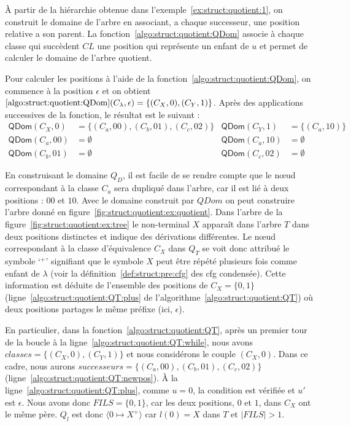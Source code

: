 \begin{example}%
    \label{ex:struct:quotient:2}
    À partir de la hiérarchie obtenue dans l'exemple~\ref{ex:struct:quotient:1}, on construit le domaine de l'arbre en associant, a chaque successeur, une position relative a son parent.
    La fonction~\ref{algo:struct:quotient:QDom} associe à chaque classe qui succèdent $CL$ une position qui représente un enfant de $u$ et permet de calculer le domaine de l'arbre quotient.

    Pour calculer les positions à l'aide de la fonction~\ref{algo:struct:quotient:QDom}, on commence à la position $\epsilon$ et on obtient $\ref{algo:struct:quotient:QDom}(C_\lambda, \epsilon) = \{(C_X, 0), (C_Y, 1)\}$.
    Après des applications successives de la fonction, le résultat est le suivant :
    \begin{align*}
        \textsf{QDom}(C_X, 0)  & = \{(C_a, 00), (C_b, 01), (C_c, 02)\} & \textsf{QDom}(C_Y, 1)  & = \{(C_a, 10)\} \\
        \textsf{QDom}(C_a, 00) & = \emptyset                           & \textsf{QDom}(C_a, 10) & = \emptyset     \\
        \textsf{QDom}(C_b, 01) & = \emptyset                           & \textsf{QDom}(C_c, 02) & = \emptyset
    \end{align*}

    En construisant le domaine $Q_D$, il est facile de se rendre compte que le nœud correspondant à la classe $C_a$ sera dupliqué dans l'arbre, car il est lié à deux positions : $00$ et $10$.
    Avec le domaine construit par $QDom$ on peut construire l'arbre donné en figure~\ref{fig:struct:quotient:ex:quotient}.
    Dans l'arbre de la figure~\ref{fig:struct:quotient:ex:tree} le non-terminal $X$ apparaît dans l'arbre $T$ dans deux positions distinctes et indique des dérivations différentes.
    Le nœud correspondant à la classe d'équivalence $C_X$ dans $Q_T$ se voit donc attribué le symbole `${}^+$' signifiant que le symbole $X$ peut être répété plusieurs fois comme enfant de $\lambda$ (voir la définition~\ref{def:struct:pre:cfg} des \gls{cfg} condensée).
    Cette information est déduite de l'ensemble des positions de $C_X = \{0, 1\}$ (ligne~\ref{algo:struct:quotient:QT:plus} de l'algorithme~\ref{algo:struct:quotient:QT}) où deux positions partages le même préfixe (ici, $\epsilon$).
    
    En particulier, dans la fonction~\ref{algo:struct:quotient:QT}, après un premier tour de la boucle  à la ligne~\ref{algo:struct:quotient:QT:while}, nous avons $classes= \{(C_X, 0), (C_Y,1)\}$ et nous considérons le couple $(C_X, 0)$.
    Dans ce cadre, nous aurons $successeurs = \{(C_a, 00), (C_b,01), (C_c,02)\}$ (ligne~\ref{algo:struct:quotient:QT:newpos}).
    À la ligne~\ref{algo:struct:quotient:QT:plus}, comme $u = 0$, la condition est vérifiée et $u'$ est $\epsilon$.
    Nous avons donc $FILS = \{0,1\}$, car les deux positions, $0$ et $1$, dans $C_X$ ont le même père.
    $Q_l$ est donc $\langle 0 \mapsto X^+\rangle$ car $l(0) = X$ dans $T$ et $\lvert FILS \rvert > 1$.
\end{example}

